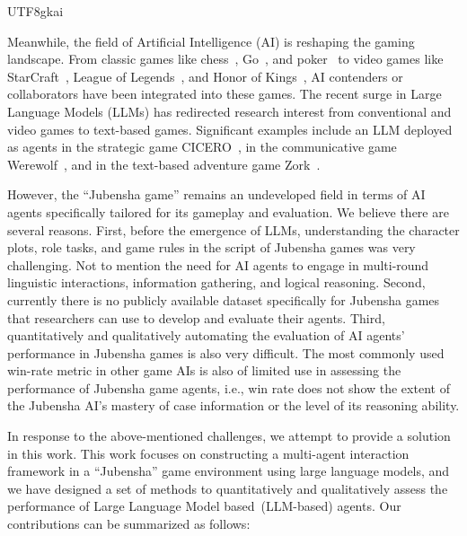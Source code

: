 \documentclass[11pt]{article}
\begin{document}
\begin{CJK}{UTF8}{gkai}

Meanwhile, the field of Artificial Intelligence (AI) is reshaping the gaming landscape. From classic games like chess~\cite{CAMPBELL200257}, Go~\cite{SilverHuangEtAl16nature}, and poker~\cite{ai_poker,brown2020combining} to video games like StarCraft~\cite{vinyals2017starcraft,vinyals2019grandmaster}, League of Legends~\cite{10.5555/3505464.3505511}, and Honor of Kings~\cite{10.5555/3495724.3495777}, AI contenders or collaborators have been integrated into these games. The recent surge in Large Language Models (LLMs) has redirected research interest from conventional and video games to text-based games. Significant examples include an LLM deployed as agents in the strategic game CICERO~\cite{meta2022human}, in the communicative game Werewolf~\cite{xu2023exploring}, and in the text-based adventure game Zork~\cite{tsai2023large}.

However, the ``Jubensha game'' remains an undeveloped field in terms of AI agents specifically tailored for its gameplay and evaluation. We believe there are several reasons. First, before the emergence of LLMs, understanding the character plots, role tasks, and game rules in the script of Jubensha games was very challenging. Not to mention the need for AI agents to engage in multi-round linguistic interactions, information gathering, and logical reasoning. Second, currently there is no publicly available dataset specifically for Jubensha games that researchers can use to develop and evaluate their agents. Third, quantitatively and qualitatively automating the evaluation of AI agents' performance in Jubensha games is also very difficult. The most commonly used win-rate metric in other game AIs is also of limited use in assessing the performance of Jubensha game agents, i.e., win rate does not show the extent of the Jubensha AI's mastery of case information or the level of its reasoning ability.

In response to the above-mentioned challenges, we attempt to provide a solution in this work. This work focuses on constructing a multi-agent interaction framework in a ``Jubensha'' game environment using large language models, and we have designed a set of methods to quantitatively and qualitatively assess the performance of Large Language Model based~(LLM-based) agents. Our contributions can be summarized as follows:


\end{CJK}
\end{document}
